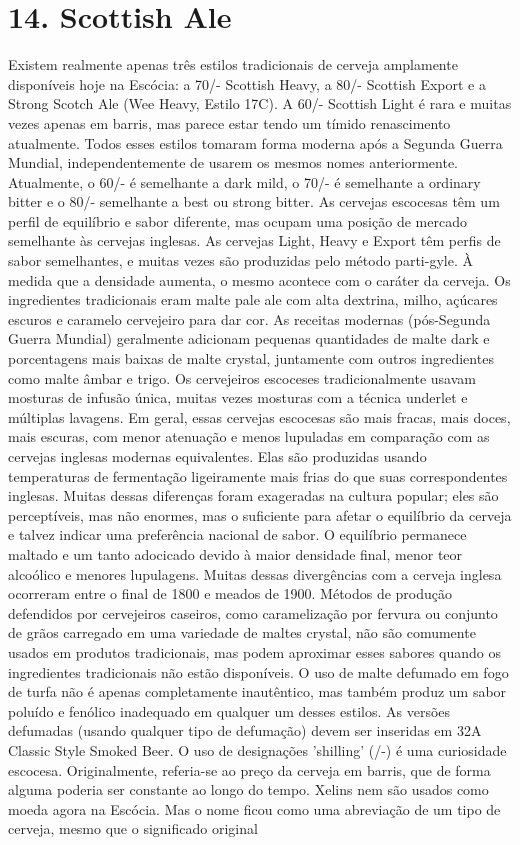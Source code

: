 \section*{14. Scottish Ale}

Existem realmente apenas três estilos tradicionais de cerveja amplamente disponíveis hoje na Escócia: a 70/- Scottish Heavy, a 80/- Scottish Export e a Strong Scotch Ale (Wee Heavy, Estilo 17C). A 60/- Scottish Light é rara e muitas vezes apenas em barris, mas parece estar tendo um tímido renascimento atualmente. Todos esses estilos tomaram forma moderna após a Segunda Guerra Mundial, independentemente de usarem os mesmos nomes anteriormente. Atualmente, o 60/- é semelhante a dark mild, o 70/- é semelhante a ordinary bitter e o 80/- semelhante a best ou strong bitter. As cervejas escocesas têm um perfil de equilíbrio e sabor diferente, mas ocupam uma posição de mercado semelhante às cervejas inglesas. As cervejas Light, Heavy e Export têm perfis de sabor semelhantes, e muitas vezes são produzidas pelo método parti-gyle. À medida que a densidade aumenta, o mesmo acontece com o caráter da cerveja. Os ingredientes tradicionais eram malte pale ale com alta dextrina, milho, açúcares escuros e caramelo cervejeiro para dar cor. As receitas modernas (pós-Segunda Guerra Mundial) geralmente adicionam pequenas quantidades de malte dark e porcentagens mais baixas de malte crystal, juntamente com outros ingredientes como malte âmbar e trigo. Os cervejeiros escoceses tradicionalmente usavam mosturas de infusão única, muitas vezes mosturas com a técnica underlet e múltiplas lavagens. Em geral, essas cervejas escocesas são mais fracas, mais doces, mais escuras, com menor atenuação e menos lupuladas em comparação com as cervejas inglesas modernas equivalentes. Elas são produzidas usando temperaturas de fermentação ligeiramente mais frias do que suas correspondentes inglesas. Muitas dessas diferenças foram exageradas na cultura popular; eles são perceptíveis, mas não enormes, mas o suficiente para afetar o equilíbrio da cerveja e talvez indicar uma preferência nacional de sabor. O equilíbrio permanece maltado e um tanto adocicado devido à maior densidade final, menor teor alcoólico e menores lupulagens. Muitas dessas divergências com a cerveja inglesa ocorreram entre o final de 1800 e meados de 1900. Métodos de produção defendidos por cervejeiros caseiros, como caramelização por fervura ou conjunto de grãos carregado em uma variedade de maltes crystal, não são comumente usados em produtos tradicionais, mas podem aproximar esses sabores quando os ingredientes tradicionais não estão disponíveis. O uso de malte defumado em fogo de turfa não é apenas completamente inautêntico, mas também produz um sabor poluído e fenólico inadequado em qualquer um desses estilos. As versões defumadas (usando qualquer tipo de defumação) devem ser inseridas em 32A Classic Style Smoked Beer. O uso de designações 'shilling' (/-) é uma curiosidade escocesa. Originalmente, referia-se ao preço da cerveja em barris, que de forma alguma poderia ser constante ao longo do tempo. Xelins nem são usados como moeda agora na Escócia. Mas o nome ficou como uma abreviação de um tipo de cerveja, mesmo que o significado original 